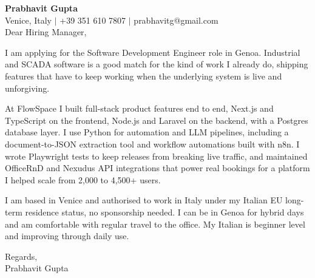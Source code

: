 \documentclass[a4paper,10.5pt]{article}
\begin{document}
\textbf{Prabhavit Gupta}\\
Venice, Italy $\vert$ +39 351 610 7807 $\vert$ prabhavitg@gmail.com\\[10pt]
Dear Hiring Manager,

I am applying for the Software Development Engineer role in Genoa. Industrial and SCADA software is a good match for the kind of work I already do, shipping features that have to keep working when the underlying system is live and unforgiving.

At FlowSpace I built full-stack product features end to end, Next.js and TypeScript on the frontend, Node.js and Laravel on the backend, with a Postgres database layer. I use Python for automation and LLM pipelines, including a document-to-JSON extraction tool and workflow automations built with n8n. I wrote Playwright tests to keep releases from breaking live traffic, and maintained OfficeRnD and Nexudus API integrations that power real bookings for a platform I helped scale from 2,000 to 4,500+ users.

I am based in Venice and authorised to work in Italy under my Italian EU long-term residence status, no sponsorship needed. I can be in Genoa for hybrid days and am comfortable with regular travel to the office. My Italian is beginner level and improving through daily use.

Regards,\\
Prabhavit Gupta
\end{document}
